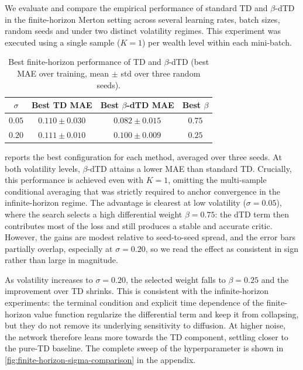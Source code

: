 \documentclass{article}
\begin{document}
We evaluate and compare the empirical performance of standard TD and $\beta$-dTD in the finite-horizon Merton setting across several learning rates, batch sizes, random seeds and under two distinct volatility regimes. This experiment was executed using a single sample ($K = 1$) per wealth level within each mini-batch.


\begin{table}[t]
    \centering
    \caption{Best finite-horizon performance of TD and $\beta$-dTD (best MAE over training, mean $\pm$ std over three random seeds).}
    \label{tab:finite_horizon_hpo}
    \small
    \begin{tabular}{cccc}
        \toprule
        $\sigma$
        & Best TD MAE
        & Best $\beta$-dTD MAE
        & Best $\beta$ \\
        \midrule
        $0.05$ & $0.110 \pm 0.030$ & $\mathbf{0.082 \pm 0.015}$ & $0.75$  \\
        $0.20$ & $0.111 \pm 0.010$ & $\mathbf{0.100 \pm 0.009}$ & $0.25$ \\
        \bottomrule
    \end{tabular}
\end{table}

 reports the best configuration for each method, averaged over three seeds. At both volatility levels, $\beta$-dTD attains a lower MAE than standard TD. Crucially, this performance is achieved even with $K=1$, omitting the multi-sample conditional averaging that was strictly required to anchor convergence in the infinite-horizon regime. The advantage is clearest at low volatility ($\sigma=0.05$), where the search selects a high differential weight $\beta=0.75$: the dTD term then contributes most of the loss and still produces a stable and accurate critic. However, the gains are modest relative to seed-to-seed spread, and the error bars partially overlap, especially at $\sigma=0.20$, so we read the effect as consistent in sign rather than large in magnitude.

As volatility increases to $\sigma=0.20$, the selected weight falls to $\beta=0.25$ and the improvement over TD shrinks. This is consistent with the infinite-horizon experiments: the terminal condition and explicit time dependence of the finite-horizon value function regularize the differential term and keep it from collapsing, but they do not remove its underlying sensitivity to diffusion. At higher noise, the network therefore leans more towards the TD component, settling closer to the pure-TD baseline. The complete sweep of the hyperparameter is shown in \cref{fig:finite-horizon-sigma-comparison} in the appendix.
\end{document}
